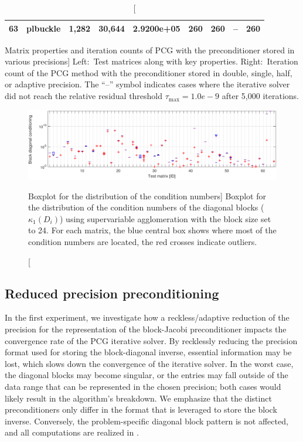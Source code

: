 \begin{table}[p]
\begin{center}
\begin{tabular}{rlrrr||rrrr}
 63 &   plbuckle & 1,282 &    30,644 & 2.9200e+05 & 260 &  260 &  -- &  260 \\
 \hline
 \hline
\end{tabular}
\end{center}
\caption
[Matrix properties and iteration counts of PCG with the
preconditioner stored in various precisions]
{Left:~Test matrices along with key properties. Right:~Iteration count 
of 
the PCG method with the preconditioner stored in double, single, half, or 
adaptive precision.
The ``--'' symbol indicates cases where the iterative solver did not reach the 
relative residual threshold $\tau_{\max}=1.0e-9$ after 5,000 iterations.}
\label{2017-adaptive-block-jacobi:tab:matrices}
\end{table}

\begin{figure}[t]
\begin{center}
\includegraphics[width=\textwidth]{plots/boxplot_log_cond}
\caption
[Boxplot for the distribution of the condition numbers]
{Boxplot for the distribution of the condition numbers 
         of the diagonal blocks ($\kappa_1(D_i)$) using supervariable 
         agglomeration with the block size set to 24. For each matrix, the blue 
         central box shows where most of the condition numbers are located, the 
         red crosses indicate outliers.}
\label{2017-adaptive-block-jacobi:fig:blockcondnums}
\end{center}
\end{figure}

\subsection{Reduced precision preconditioning}

In the first experiment, we investigate how a reckless/adaptive reduction of the
precision for the representation of the block-Jacobi preconditioner impacts the
convergence rate of the PCG iterative solver. By recklessly reducing the
precision format used for storing the block-diagonal inverse, essential
information may be lost, which slows down the convergence of the
iterative solver. In the worst case, the diagonal blocks may become singular, or
the entries may fall outside of the data range that can be represented in the
chosen precision; both cases would likely result in the algorithm's breakdown. 
We
emphasize that the distinct preconditioners only differ in the format that is
leveraged to store the block inverse. Conversely, the problem-specific diagonal
block pattern is not affected, and
all computations are realized in \fpd.

